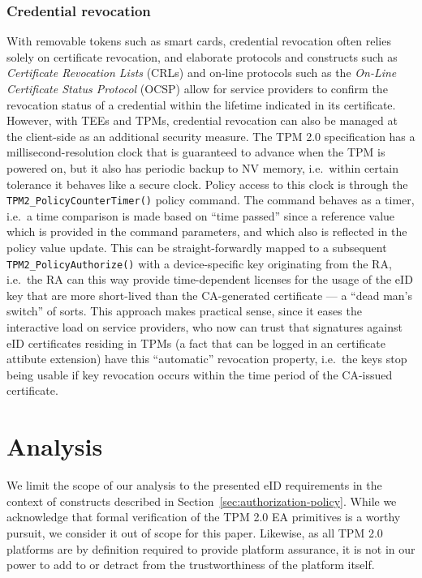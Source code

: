 \documentclass{sig-alternate-2013}
\begin{document}
\subsubsection{Credential revocation}
\label{sec:credential-revocation}

With removable tokens such as smart cards, credential revocation often relies
solely on certificate revocation, and elaborate protocols and constructs such as
\emph{Certificate Revocation Lists} (CRLs) and on-line protocols such as the
\emph{On-Line Certificate Status Protocol} (OCSP) allow for service providers to
confirm the revocation status of a credential within the lifetime indicated in
its certificate. However, with TEEs and TPMs, credential revocation can also be
managed at the client-side as an additional security measure. The TPM 2.0
specification has a millisecond-resolution clock that is guaranteed to advance
when the TPM is powered on, but it also has periodic backup to NV memory, i.e.\
within certain tolerance it behaves like a secure clock. Policy access to this
clock is through the \texttt{TPM2\_PolicyCounterTimer()} policy command. The
command behaves as a timer, i.e.\ a time comparison is made based on ``time
passed'' since a reference value which is provided in the command parameters,
and which also is reflected in the policy value update. This can be
straight-forwardly mapped to a subsequent \texttt{TPM2\_PolicyAuthorize()} with
a device-specific key originating from the RA, i.e.\ the RA can this way provide
time-dependent licenses for the usage of the eID key that are more short-lived
than the CA-generated certificate --- a ``dead man's switch'' of sorts. This
approach makes practical sense, since it eases the interactive load on service
providers, who now can trust that signatures against eID certificates residing
in TPMs (a fact that can be logged in an certificate attibute extension) have
this ``automatic'' revocation property, i.e.\ the keys stop being usable if key
revocation occurs within the time period of the CA-issued certificate.

 
\section{Analysis}
\label{sec:analysis}

We limit the scope of our analysis to the presented eID requirements in the
context of constructs described in Section~\ref{sec:authorization-policy}.
While we acknowledge that formal verification of the TPM 2.0 EA primitives is a
worthy pursuit, we consider it out of scope for this paper. Likewise, as all
TPM 2.0 platforms are by definition required to provide platform assurance, it
is not in our power to add to or detract from the trustworthiness of the
platform itself.
\end{document}
